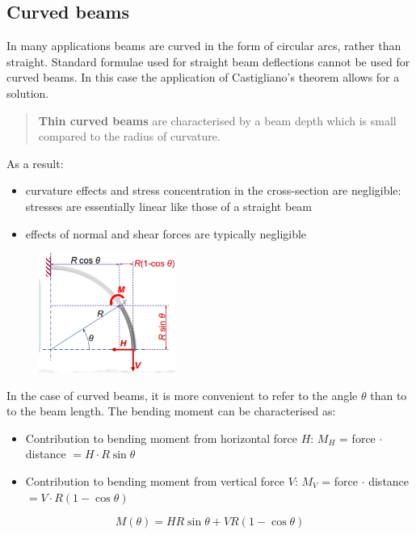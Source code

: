 \documentclass[class=report, crop=false, 12pt,a4paper]{standalone}
\begin{document}
\subsection{Curved beams}
In many applications beams are curved in the form of circular arcs, rather than straight. Standard formulae used for straight beam deflections cannot be used for curved beams. In this case the application of Castigliano's theorem allows for a solution.
\begin{quotation}
  \textbf{Thin curved beams} are characterised by a beam depth which is small compared to the radius of curvature.
\end{quotation}
As a result:
\begin{itemize}
  \item curvature effects and stress concentration in the cross-section are negligible: stresses are essentially linear like those of a straight beam
  \item effects of normal and shear forces are typically negligible
\end{itemize}
\begin{figure}[H]
  \centering
  \includegraphics[width = 0.4\textwidth]{../img/diagram17.png}
  \caption{}
\end{figure}
In the case of curved beams, it is more convenient to refer to the angle $\theta$ than to to the beam length. The bending moment can be characterised as:
\begin{itemize}
  \item Contribution to bending moment from horizontal force $H$: $M_H$ = force $\cdot$ distance $ = H\cdot R \sin{\theta}$
  \item Contribution to bending moment from vertical force $V$: $M_V$ = force $\cdot$ distance $ = V\cdot R \left(1-\cos{\theta}\right)$
\end{itemize}
\begin{equation}
  M(\theta) = HR \sin \theta + VR \left(1-\cos\theta\right)
\end{equation}
\end{document}
